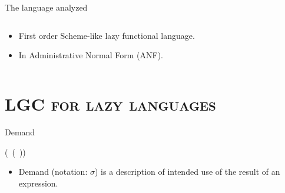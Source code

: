 \documentclass[xcolor=x11names,compress,mathserif]{beamer}
\renewcommand{\(}{\begin{columns}}
\renewcommand{\)}{\end{columns}}
\newcommand{\<}[1]{\begin{column}{#1}}
\renewcommand{\>}{\end{column}}
\begin{document}
\begin{frame}{The language analyzed}
\begin{columns}
  \begin{column}[T]{0.45\textwidth}
\small
    \begin{itemize} \itemsep0.75em
    \item First order Scheme-like lazy functional language.
    \item In Administrative Normal Form (ANF).
    \end{itemize}
\normalsize
  \end{column}
  \begin{column}[T]{0.55\textwidth}
    
  \end{column}
\end{columns}
\end{frame}
\section{\scshape LGC for lazy languages}

\begin{frame}{Demand}
  \begin{center}
     (\CAR\ (\CDR\ \pw)) \\
  \end{center}
  \pause
\centerline{}
  \begin{itemize}
  \item Demand  (notation: $\sigma$) is a description  of intended use
    of the result of an expression.
  \end{itemize}
\end{frame}

\end{document}
